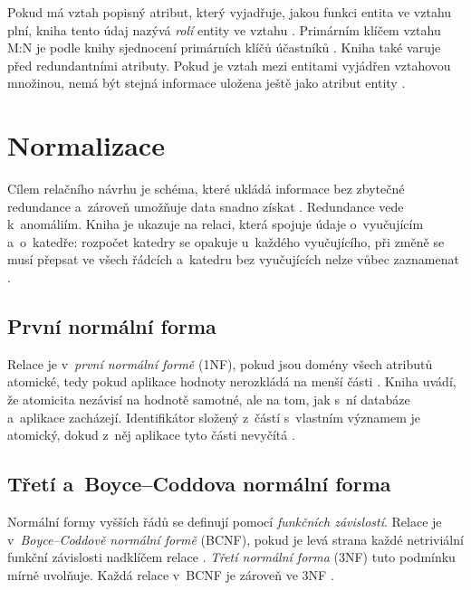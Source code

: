 Pokud má vztah popisný atribut, který vyjadřuje, jakou funkci entita ve vztahu plní, kniha tento údaj nazývá \emph{rolí} entity ve vztahu \cite[s.~247]{Silberschatz2020}. Primárním klíčem vztahu M:N je podle knihy sjednocení primárních klíčů účastníků \cite[s.~257--258]{Silberschatz2020}. Kniha také varuje před redundantními atributy. Pokud je vztah mezi entitami vyjádřen vztahovou množinou, nemá být stejná informace uložena ještě jako atribut entity \cite[s.~261--262, 280]{Silberschatz2020}.

\section{Normalizace}\label{sec:principy-normalizace}

Cílem relačního návrhu je schéma, které ukládá informace bez zbytečné redundance a~zároveň umožňuje data snadno získat \cite[s.~303]{Silberschatz2020}. Redundance vede k~anomáliím. Kniha je ukazuje na relaci, která spojuje údaje o~vyučujícím a~o~katedře: rozpočet katedry se opakuje u~každého vyučujícího, při změně se musí přepsat ve všech řádcích a~katedru bez vyučujících nelze vůbec zaznamenat \cite[s.~303--304]{Silberschatz2020}.

\subsection{První normální forma}

Relace je v~\emph{první normální formě} (1NF), pokud jsou domény všech atributů atomické, tedy pokud aplikace hodnoty nerozkládá na menší části \cite[s.~342]{Silberschatz2020}. Kniha uvádí, že atomicita nezávisí na hodnotě samotné, ale na tom, jak s~ní databáze a~aplikace zacházejí. Identifikátor složený z~částí s~vlastním významem je atomický, dokud z~něj aplikace tyto části nevyčítá \cite[s.~342--343]{Silberschatz2020}.

\subsection{Třetí a~Boyce--Coddova normální forma}

Normální formy vyšších řádů se definují pomocí \emph{funkčních závislostí}. Relace je v~\emph{Boyce--Coddově normální formě} (BCNF), pokud je levá strana každé netriviální funkční závislosti nadklíčem relace \cite[s.~313--314]{Silberschatz2020}. \emph{Třetí normální forma} (3NF) tuto podmínku mírně uvolňuje. Každá relace v~BCNF je zároveň ve 3NF \cite[s.~317]{Silberschatz2020}.

